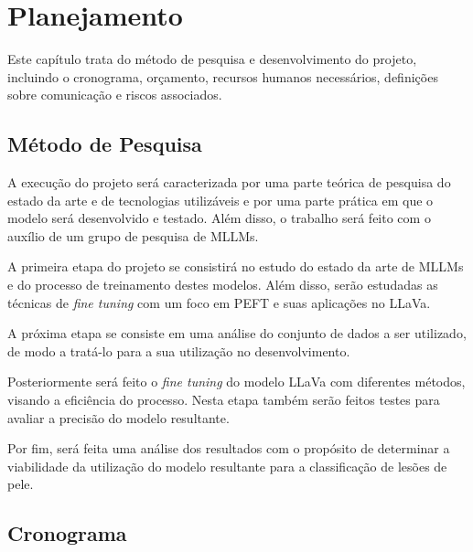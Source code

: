 \chapter{Planejamento}

Este capítulo trata do método de pesquisa e desenvolvimento do projeto, incluindo o cronograma, orçamento, recursos humanos necessários, definições sobre comunicação e
riscos associados.

\section{Método de Pesquisa}

A execução do projeto será caracterizada por uma parte teórica de pesquisa do estado da arte e de tecnologias utilizáveis e por uma parte prática em que o modelo será
desenvolvido e testado. Além disso, o trabalho será feito com o auxílio de um grupo de pesquisa de \ac{MLLMs}.

A primeira etapa do projeto se consistirá no estudo do estado da arte de \ac{MLLMs} e do processo de treinamento destes modelos. Além disso, serão estudadas as técnicas
de \textit{fine tuning} com um foco em \ac{PEFT} e suas aplicações no \ac{LLaVa}.

A próxima etapa se consiste em uma análise do conjunto de dados a ser utilizado, de modo a tratá-lo para a sua utilização no desenvolvimento.

Posteriormente será feito o \textit{fine tuning} do modelo \ac{LLaVa} com diferentes métodos, visando a eficiência do processo. Nesta etapa também serão feitos testes
para avaliar a precisão do modelo resultante.

Por fim, será feita uma análise dos resultados com o propósito de determinar a viabilidade da utilização do modelo resultante para a classificação de lesões de pele.

\pagebreak

\section{Cronograma}

\vspace{-1cm}


